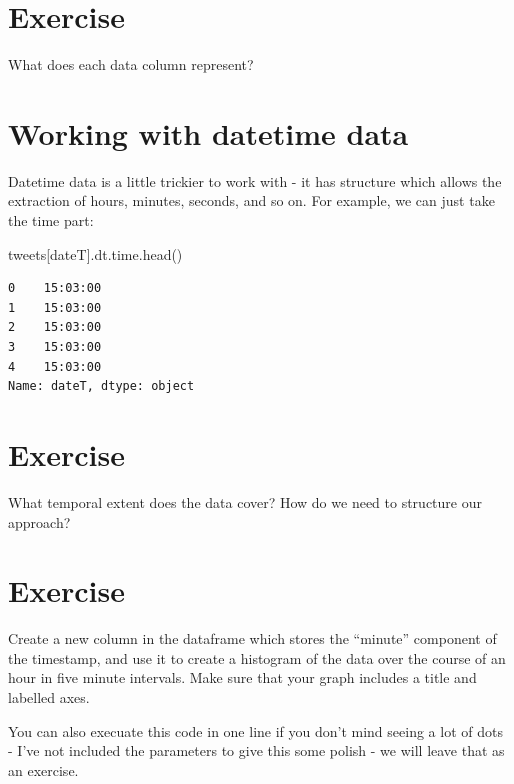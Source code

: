 \documentclass[
  letterpaper,
  DIV=11,
  numbers=noendperiod]{scrreprt}
\newenvironment{Shaded}{\begin{snugshade}}{\end{snugshade}}
\newcommand{\NormalTok}[1]{\textcolor[rgb]{0.00,0.23,0.31}{#1}}
\newcommand{\StringTok}[1]{\textcolor[rgb]{0.13,0.47,0.30}{#1}}
\begin{document}
\hypertarget{exercise-3}{%
\section{Exercise}\label{exercise-3}}

What does each data column represent?

\hypertarget{working-with-datetime-data}{%
\section{Working with datetime data}\label{working-with-datetime-data}}

Datetime data is a little trickier to work with - it has structure which
allows the extraction of hours, minutes, seconds, and so on. For
example, we can just take the time part:

\begin{Shaded}
\begin{Highlighting}[]
\NormalTok{tweets[}\StringTok{\textquotesingle{}dateT\textquotesingle{}}\NormalTok{].dt.time.head()}
\end{Highlighting}
\end{Shaded}

\begin{verbatim}
0    15:03:00
1    15:03:00
2    15:03:00
3    15:03:00
4    15:03:00
Name: dateT, dtype: object
\end{verbatim}

\hypertarget{exercise-4}{%
\section{Exercise}\label{exercise-4}}

What temporal extent does the data cover? How do we need to structure
our approach?

\hypertarget{exercise-5}{%
\section{Exercise}\label{exercise-5}}

Create a new column in the dataframe which stores the ``minute''
component of the timestamp, and use it to create a histogram of the data
over the course of an hour in five minute intervals. Make sure that your
graph includes a title and labelled axes.

You can also execuate this code in one line if you don't mind seeing a
lot of dots - I've not included the parameters to give this some polish
- we will leave that as an exercise.
\end{document}
